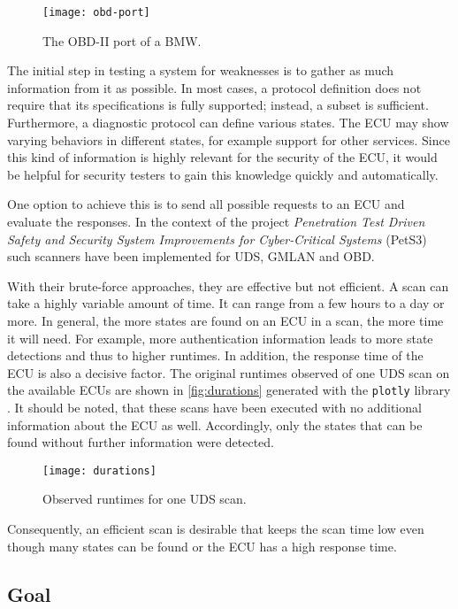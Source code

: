 \begin{figure}[h]
    \centering
    \texttt{[image: obd-port]}
    \caption{The OBD-II port of a BMW.}
    \label{fig:obd-port}
\end{figure}

The initial step in testing a system for weaknesses is to gather as much information from it as possible. In most cases, a protocol definition does not require that its specifications is fully supported; instead, a subset is sufficient.
Furthermore, a diagnostic protocol can define various states. The ECU may show varying behaviors in different states, for example support for other services. Since this kind of information is highly relevant for the security of the ECU, it would be helpful for security testers to gain this knowledge quickly and automatically.

One option to achieve this is to send all possible requests to an ECU and evaluate the responses. In the context of the project \emph{Penetration Test Driven Safety and Security System Improvements for Cyber-Critical Systems} (PetS3) \cite{pets3} such scanners have been implemented for UDS, GMLAN and OBD.

With their brute-force approaches, they are effective but not efficient. A scan can take a highly variable amount of time. It can range from a few hours to a day or more. In general, the more states are found on an ECU in a scan, the more time it will need. For example, more authentication information leads to more state detections and thus to higher runtimes. In addition, the response time of the ECU is also a decisive factor. The original runtimes observed of one UDS scan on the available ECUs are shown in \autoref{fig:durations} generated with the \texttt{plotly} library \cite{plotly}. It should be noted, that these scans have been executed with no additional information about the ECU as well. Accordingly, only the states that can be found without further information were detected.

\begin{figure}[h]
    \centering
    \texttt{[image: durations]}
    \caption{Observed runtimes for one UDS scan.}
    \label{fig:durations}
\end{figure}

Consequently, an efficient scan is desirable that keeps the scan time low even though many states can be found or the ECU has a high response time.

\subsection{Goal}

